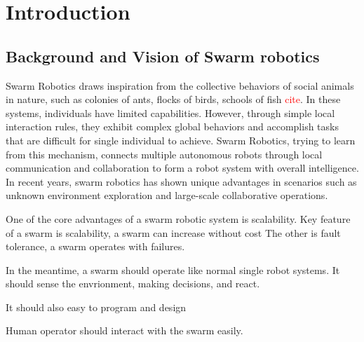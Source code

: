 \chapter{Introduction}
\label{ch1}



\section{Background and Vision of Swarm robotics}



Swarm Robotics draws inspiration from the collective behaviors of social animals in nature, such as colonies of ants, flocks of birds, schools of fish \textcolor{red}{cite}.
In these systems, individuals have limited capabilities.
However, through simple local interaction rules, they exhibit complex global behaviors and accomplish tasks that are difficult for single individual to achieve.
Swarm Robotics, trying to learn from this mechanism, connects multiple autonomous robots through local communication and collaboration to form a robot system with overall intelligence.
In recent years, swarm robotics has shown unique advantages in scenarios such as unknown environment exploration and large-scale collaborative operations.

One of the core advantages of a swarm robotic system is scalability.
Key feature of a swarm is scalability, a swarm can increase without cost
The other is fault tolerance, a swarm operates with failures.

In the meantime, a swarm should operate like normal single robot systems.
It should sense the envrionment, making decisions, and react.

It should also easy to program and design

Human operator should interact with the swarm easily.

